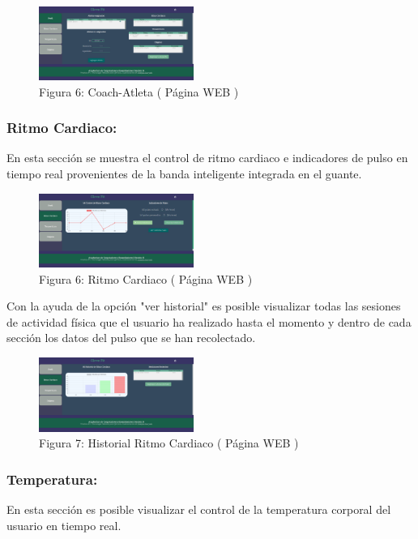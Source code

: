 \documentclass[osajnl,twocolumn,showpacs,superscriptaddress,10pt]{revtex4-1}
\begin{document}
\begin{figure} [H] \centering 
\caption{Figura 6: Coach-Atleta ( Página WEB )}
\includegraphics[width=0.45\textwidth]{CoachAtleta.PNG}
\end{figure}

\subsubsection{Ritmo Cardiaco:}
    En esta sección se muestra el control de ritmo cardiaco e indicadores de pulso en tiempo real provenientes de la banda inteligente integrada en el guante.
    
\begin{figure} [H] \centering 
\caption{Figura 6: Ritmo Cardiaco ( Página WEB )}
\includegraphics[width=0.45\textwidth]{RitmoC.PNG}
\end{figure}

    Con la ayuda de la opción "ver historial" es posible visualizar todas las sesiones de actividad física que el usuario ha realizado hasta el momento y dentro de cada sección los datos del pulso que se han recolectado.
    
\begin{figure} [H] \centering 
\caption{Figura 7: Historial Ritmo Cardiaco ( Página WEB )}
\includegraphics[width=0.45\textwidth]{RitmoCh.PNG}
\end{figure}

\subsubsection{Temperatura:}
    En esta sección es posible visualizar el control de la temperatura corporal del usuario en tiempo real.
    
\end{document}
